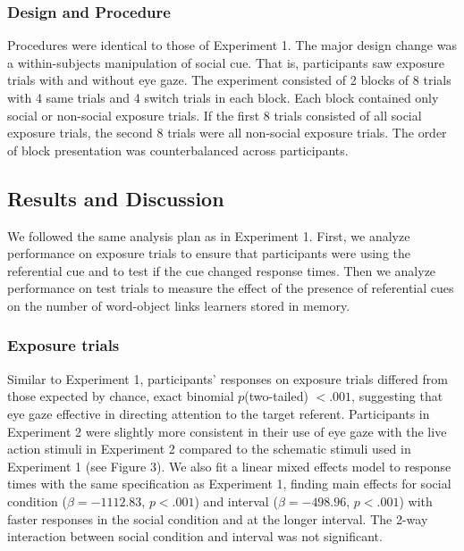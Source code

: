 \documentclass[10pt,letterpaper]{article}
\begin{document}
\subsubsection{Design and Procedure}

Procedures were identical to those of Experiment 1. The major design change was a within-subjects manipulation of social cue. That is, participants saw exposure trials with and without eye gaze. The experiment consisted of 2 blocks of 8 trials with 4 same trials and 4 switch trials in each block. Each block contained only social or non-social exposure trials. If the first 8 trials consisted of all social exposure trials, the second 8 trials were all non-social exposure trials. The order of block presentation was counterbalanced across participants. 

\subsection{Results and Discussion}

We followed the same analysis plan as in Experiment 1. First, we analyze performance on exposure trials to ensure that participants were using the referential cue and to test if the cue changed response times. Then we analyze performance on test trials to measure the effect of  the presence of referential cues on the number of word-object links learners stored in memory.

\subsubsection{Exposure trials}

Similar to Experiment 1, participants' responses on exposure trials differed from those expected by chance, exact binomial  $p$(two-tailed) $< .001$, suggesting that eye gaze effective in directing attention to the target referent. Participants in Experiment 2 were slightly more consistent in their use of eye gaze with the live action stimuli in Experiment 2 compared to the schematic stimuli used in Experiment 1 (see Figure 3). We also fit a linear mixed effects  model to response times with the same specification as Experiment 1, finding main effects for social condition ($\beta=  -1112.83$, $p< .001$) and interval ($\beta=  -498.96 $, $p< .001$) with faster responses in the social condition and at the longer interval. The 2-way interaction between social condition and interval was not significant.

\end{document}

